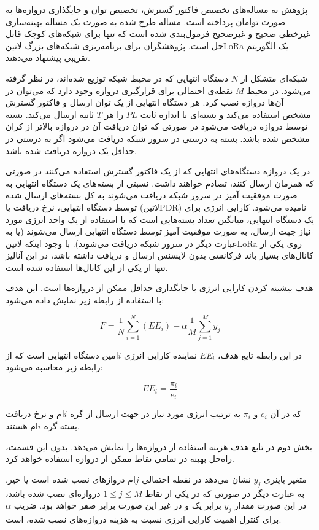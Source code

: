 
پژوهش  به مساله‌های تخصیص فاکتور گسترش، تخصیص توان و جایگذاری دروازه‌ها به صورت توامان پرداخته است.
مساله طرح شده به صورت یک مساله بهینه‌سازی غیرخطی صحیح و غیرصحیح فرمول‌بندی شده است که تنها برای شبکه‌های کوچک قابل حل است.
پژوهشگران برای برنامه‌ریزی شبکه‌های بزرگ ‌لاتین{LoRa} یک الگوریتم تقریبی پیشنهاد می‌دهند.

شبکه‌ای متشکل از $N$ دستگاه انتهایی که در محیط شبکه توزیع شده‌اند، در نظر گرفته می‌شود.
در محیط $M$ نقطه‌ی احتمالی برای قرارگیری دروازه وجود دارد که می‌توان در آن‌ها دروازه نصب کرد.
هر دستگاه انتهایی از یک توان ارسال و فاکتور گسترش مشخص استفاده می‌کند و بسته‌ای با اندازه ثابت $PL$ را هر $T$ ثانیه ارسال می‌کند.
بسته توسط دروازه دریافت می‌شود در صورتی که توان دریافت آن در دروازه بالاتر از کران مشخص شده باشد.
بسته به درستی در سرور شبکه دریافت می‌شود اگر به درستی در حداقل یک دروازه دریافت شده باشد.

در یک دروازه دستگاه‌های انتهایی که از یک فاکتور گسترش استفاده می‌کنند در صورتی که همزمان ارسال کنند،
تصادم خواهند داشت. نسبتی از بسته‌های یک دستگاه انتهایی به صورت موفقیت آمیز در سرور شبکه دریافت می‌شوند به کل
بسته‌های ارسال شده توسط دستگاه انتهایی، نرخ دریافت یا (‌لاتین{PDR}) نامیده می‌شود.
کارایی انرژی برای یک دستگاه انتهایی، میانگین تعداد بسته‌هایی است که
با استفاده از یک واحد انرژی مورد نیاز جهت ارسال،
به صورت موففیت آمیز توسط دستگاه انتهایی ارسال
می‌شوند (یا به عبارت دیگر در سرور شبکه دریافت می‌شوند).
با وجود اینکه ‌لاتین{LoRa} روی یکی از کانال‌های بسیار باند فرکانسی بدون لایسنس ارسال و دریافت
داشته باشد، در این آنالیز تنها از یکی از این کانال‌ها استفاده شده است.

هدف بیشینه کردن کارایی انرژی با جایگذاری حداقل ممکن از دروازه‌ها است.
این هدف با استفاده از رابطه زیر نمایش داده می‌شود:

\[
  F = \frac{1}{N} \sum_{i=1}^{N}(EE_{i}) - \alpha \frac{1}{M} \sum_{j=1}^{M}y_{j}
\]

در این رابطه تابع هدف،
$EE_{i}$
نماینده کارایی انرژی $i$امین دستگاه انتهایی است که از رابطه زیر محاسبه می‌شود:

\[
  EE_{i} = \frac{\pi_{i}}{e_{i}}
\]

که در آن $e_{i}$ و $\pi_{i}$
به ترتیب انرژی مورد نیاز در جهت ارسال از گره $i$ام
و نرخ دریافت بسته گره $i$ام هستند.

بخش دوم در تابع هدف هزینه استفاده از دروازه‌ها را نمایش می‌دهد.
بدون این قسمت، راه‌حل بهینه در تمامی نقاط ممکن از دروازه استفاده
خواهد کرد.

متغیر باینری $y_{j}$ نشان می‌دهد در نقطه احتمالی $j$ام
دروازهای نصب شده است یا خیر. به عبارت دیگر
در صورتی که در یکی از نقاط
$1 \le j \le M$
دروازه‌ای نصب شده باشد، در این صورت مقدار $y_{j}$ برابر یک و در غیر این صورت برابر صفر خواهد بود.
ضریب $\alpha$ برای کنترل اهمیت کارایی انرژی نسبت به هزینه دروازه‌های نصب شده، است.

